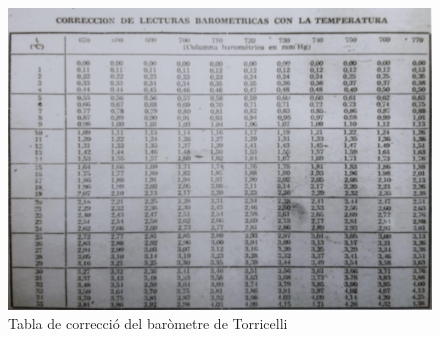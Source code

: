 \documentclass{article}
\begin{document}
        \vspace{1cm}
        \begin{figure}[h]
            \centering
            \includegraphics[width=.79\textwidth]{fotos/tablaBarometro.png}
            \caption{Tabla de correcció del baròmetre de Torricelli}
            \label{fig:tabla}
        \end{figure}
        \clearpage
\end{document}

